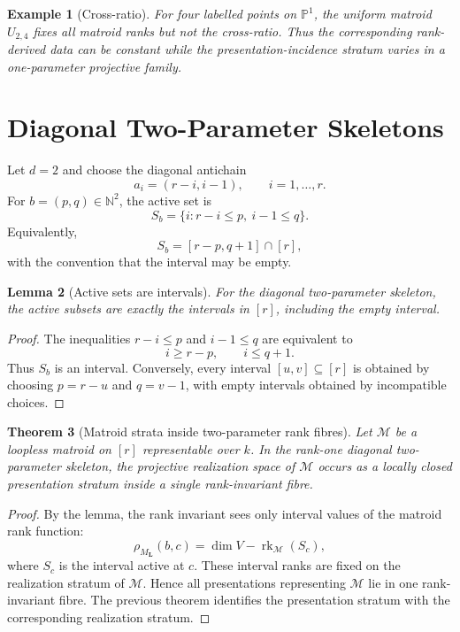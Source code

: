 \documentclass[11pt]{article}
\newtheorem{theorem}{Theorem}[section]
\newtheorem{lemma}[theorem]{Lemma}
\newtheorem{example}[theorem]{Example}
\begin{document}
\begin{example}[Cross-ratio]
For four labelled points on \(\mathbb P^1\), the uniform matroid \(U_{2,4}\) fixes all matroid ranks but not the cross-ratio. Thus the corresponding rank-derived data can be constant while the presentation-incidence stratum varies in a one-parameter projective family.
\end{example}

\section{Diagonal Two-Parameter Skeletons}

Let \(d=2\) and choose the diagonal antichain
\[
a_i=(r-i,i-1),
\qquad
i=1,\ldots,r.
\]
For \(b=(p,q)\in\mathbb N^2\), the active set is
\[
S_b
=
\{i:r-i\le p,\ i-1\le q\}.
\]
Equivalently,
\[
S_b=[r-p,q+1]\cap [r],
\]
with the convention that the interval may be empty.

\begin{lemma}[Active sets are intervals]
For the diagonal two-parameter skeleton, the active subsets are exactly the intervals in \([r]\), including the empty interval.
\end{lemma}

\begin{proof}
The inequalities \(r-i\le p\) and \(i-1\le q\) are equivalent to
\[
i\ge r-p,
\qquad
i\le q+1.
\]
Thus \(S_b\) is an interval. Conversely, every interval \([u,v]\subseteq[r]\) is obtained by choosing \(p=r-u\) and \(q=v-1\), with empty intervals obtained by incompatible choices.
\end{proof}

\begin{theorem}[Matroid strata inside two-parameter rank fibres]
Let \(\mathcal M\) be a loopless matroid on \([r]\) representable over \(k\). In the rank-one diagonal two-parameter skeleton, the projective realization space of \(\mathcal M\) occurs as a locally closed presentation stratum inside a single rank-invariant fibre.
\end{theorem}

\begin{proof}
By the lemma, the rank invariant sees only interval values of the matroid rank function:
\[
\rho_{M_{\mathbf L}}(b,c)
=
\dim V-\operatorname{rk}_{\mathcal M}(S_c),
\]
where \(S_c\) is the interval active at \(c\). These interval ranks are fixed on the realization stratum of \(\mathcal M\). Hence all presentations representing \(\mathcal M\) lie in one rank-invariant fibre. The previous theorem identifies the presentation stratum with the corresponding realization stratum.
\end{proof}
\end{document}
